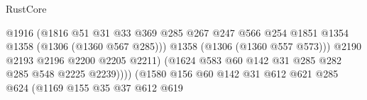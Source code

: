 \begin{lexlean}{RustCore}
\begin{coremodule}
                                                  @1916
                                                  (@1816
                                                    @51
                                                    @31
                                                    @33
                                                    @369
                                                    @285
                                                    @267
                                                    @247
                                                    @566
                                                    @254
                                                    @1851
                                                    @1354
                                                    @1358
                                                    (@1306 (@1360 @567 @285)))
                                                  @1358
                                                  (@1306 (@1360 @557 @573)))
                                                @2190
                                                @2193
                                                @2196
                                                @2200
                                                @2205
                                                @2211)
                                              (@1624
                                                @583
                                                @60
                                                @142
                                                @31
                                                @285
                                                @282
                                                @285
                                                @548
                                                @2225
                                                @2239))))
                                        (@1580
                                          @156
                                          @60
                                          @142
                                          @31
                                          @612
                                          @621
                                          @285
                                          @624
                                          (@1169
                                            @155
                                            @35
                                            @37
                                            @612
                                            @619

\end{coremodule}
\end{lexlean}
